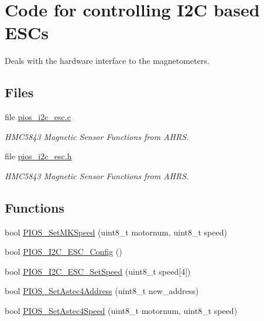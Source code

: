 \hypertarget{group___p_i_o_s___i2_c___e_s_c}{\section{\-Code for controlling \-I2\-C based \-E\-S\-Cs}
\label{group___p_i_o_s___i2_c___e_s_c}
}


\-Deals with the hardware interface to the magnetometers.  


\subsection*{\-Files}
\begin{DoxyCompactItemize}
\item 
file \hyperlink{pios__i2c__esc_8c}{pios\-\_\-i2c\-\_\-esc.\-c}
\begin{DoxyCompactList}\small\item\em \-H\-M\-C5843 \-Magnetic \-Sensor \-Functions from \-A\-H\-R\-S. \end{DoxyCompactList}\item 
file \hyperlink{pios__i2c__esc_8h}{pios\-\_\-i2c\-\_\-esc.\-h}
\begin{DoxyCompactList}\small\item\em \-H\-M\-C5843 \-Magnetic \-Sensor \-Functions from \-A\-H\-R\-S. \end{DoxyCompactList}\end{DoxyCompactItemize}
\subsection*{\-Functions}
\begin{DoxyCompactItemize}
\item 
bool \hyperlink{group___p_i_o_s___i2_c___e_s_c_ga2ac90c7dcac4c65027b9c5ecf404b6fb}{\-P\-I\-O\-S\-\_\-\-Set\-M\-K\-Speed} (uint8\-\_\-t motornum, uint8\-\_\-t speed)
\item 
bool \hyperlink{group___p_i_o_s___i2_c___e_s_c_ga492a26bc0f2ba6af15d1a7fe404a5218}{\-P\-I\-O\-S\-\_\-\-I2\-C\-\_\-\-E\-S\-C\-\_\-\-Config} ()
\item 
bool \hyperlink{group___p_i_o_s___i2_c___e_s_c_gae4ba1cbbf75c95f2613cf0bcbd977294}{\-P\-I\-O\-S\-\_\-\-I2\-C\-\_\-\-E\-S\-C\-\_\-\-Set\-Speed} (uint8\-\_\-t speed\mbox{[}4\mbox{]})
\item 
bool \hyperlink{group___p_i_o_s___i2_c___e_s_c_gaa3e804f2b7422fe94d7ffb0574db230b}{\-P\-I\-O\-S\-\_\-\-Set\-Astec4\-Address} (uint8\-\_\-t new\-\_\-address)
\item 
bool \hyperlink{group___p_i_o_s___i2_c___e_s_c_ga8c4dfebce118f053c3dbbbcfdafed2f6}{\-P\-I\-O\-S\-\_\-\-Set\-Astec4\-Speed} (uint8\-\_\-t motornum, uint8\-\_\-t speed)
\end{DoxyCompactItemize}

